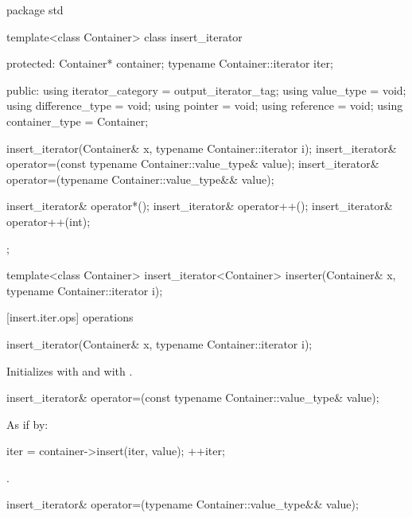 %
\begin{codeblock}
package std {
  template<class Container>
  class insert_iterator {
  protected:
    Container* container;
    typename Container::iterator iter;

  public:
    using iterator_category = output_iterator_tag;
    using value_type        = void;
    using difference_type   = void;
    using pointer           = void;
    using reference         = void;
    using container_type    = Container;

    insert_iterator(Container& x, typename Container::iterator i);
    insert_iterator& operator=(const typename Container::value_type& value);
    insert_iterator& operator=(typename Container::value_type&& value);

    insert_iterator& operator*();
    insert_iterator& operator++();
    insert_iterator& operator++(int);
  };

  template<class Container>
    insert_iterator<Container> inserter(Container& x, typename Container::iterator i);
}
\end{codeblock}

[insert.iter.ops]{ operations}

%
\begin{itemdecl}
insert_iterator(Container& x, typename Container::iterator i);
\end{itemdecl}

\begin{itemdescr}
\pnum
\effects
Initializes
with  and
with .
\end{itemdescr}

%
\begin{itemdecl}
insert_iterator& operator=(const typename Container::value_type& value);
\end{itemdecl}

\begin{itemdescr}
\pnum
\effects
As if by:
\begin{codeblock}
iter = container->insert(iter, value);
++iter;
\end{codeblock}

\pnum
\returns
{}.
\end{itemdescr}

%
\begin{itemdecl}
insert_iterator& operator=(typename Container::value_type&& value);
\end{itemdecl}


